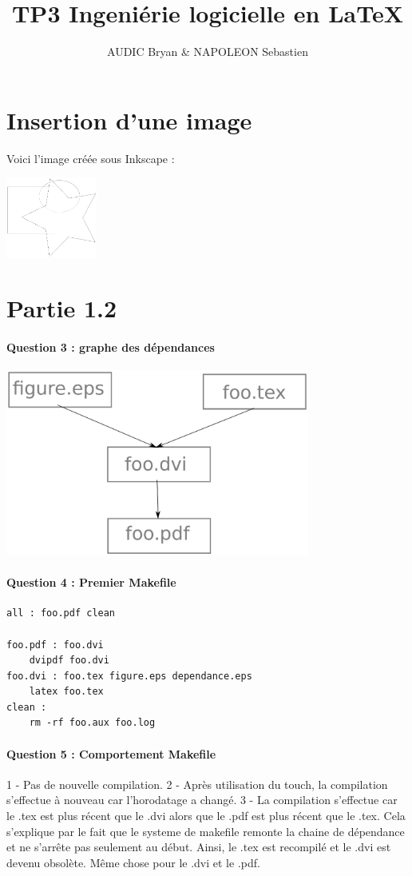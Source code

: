 \documentclass{article}
\title{TP3 Ingeniérie logicielle en \LaTeX}
\author{AUDIC Bryan \& NAPOLEON Sebastien}
\begin{document}
\maketitle
\section{Insertion d'une image}
Voici l'image créée sous Inkscape :
\begin{center}
\includegraphics[width=3cm]{figure.eps}
\end{center}
\section{Partie 1.2}
\paragraph{Question 3 : graphe des dépendances}
\begin{center}
\includegraphics[width=10cm]{dependance.eps}
\end{center}
\paragraph{Question 4 : Premier Makefile}
\begin{verbatim}
all : foo.pdf clean

foo.pdf : foo.dvi
	dvipdf foo.dvi
foo.dvi : foo.tex figure.eps dependance.eps
	latex foo.tex
clean : 
	rm -rf foo.aux foo.log
\end{verbatim}
\paragraph{Question 5 : Comportement Makefile}
1 - Pas de nouvelle compilation.
2 - Après utilisation du touch, la compilation s'effectue à nouveau car l'horodatage a changé.
3 - La compilation s'effectue car le .tex est plus récent que le .dvi alors que le .pdf est plus récent que le .tex. Cela s'explique par le fait que le systeme de makefile remonte la chaine de dépendance et ne s'arrête pas seulement au début. Ainsi, le .tex est recompilé et le .dvi est devenu obsolète. Même chose pour le .dvi et le .pdf.
\end{document}

